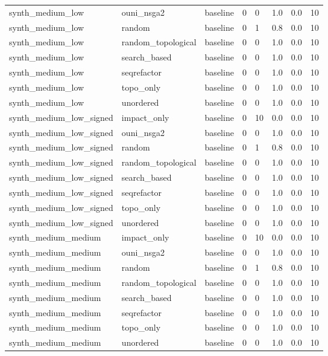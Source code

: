 \begin{table}[t]
\begin{tabular}{llllllll}
synth\_medium\_low & ouni\_nsga2 & baseline & 0 & 0 & 1.0 & 0.0 & 10 \\
synth\_medium\_low & random & baseline & 0 & 1 & 0.8 & 0.0 & 10 \\
synth\_medium\_low & random\_topological & baseline & 0 & 0 & 1.0 & 0.0 & 10 \\
synth\_medium\_low & search\_based & baseline & 0 & 0 & 1.0 & 0.0 & 10 \\
synth\_medium\_low & seqrefactor & baseline & 0 & 0 & 1.0 & 0.0 & 10 \\
synth\_medium\_low & topo\_only & baseline & 0 & 0 & 1.0 & 0.0 & 10 \\
synth\_medium\_low & unordered & baseline & 0 & 0 & 1.0 & 0.0 & 10 \\
synth\_medium\_low\_signed & impact\_only & baseline & 0 & 10 & 0.0 & 0.0 & 10 \\
synth\_medium\_low\_signed & ouni\_nsga2 & baseline & 0 & 0 & 1.0 & 0.0 & 10 \\
synth\_medium\_low\_signed & random & baseline & 0 & 1 & 0.8 & 0.0 & 10 \\
synth\_medium\_low\_signed & random\_topological & baseline & 0 & 0 & 1.0 & 0.0 & 10 \\
synth\_medium\_low\_signed & search\_based & baseline & 0 & 0 & 1.0 & 0.0 & 10 \\
synth\_medium\_low\_signed & seqrefactor & baseline & 0 & 0 & 1.0 & 0.0 & 10 \\
synth\_medium\_low\_signed & topo\_only & baseline & 0 & 0 & 1.0 & 0.0 & 10 \\
synth\_medium\_low\_signed & unordered & baseline & 0 & 0 & 1.0 & 0.0 & 10 \\
synth\_medium\_medium & impact\_only & baseline & 0 & 10 & 0.0 & 0.0 & 10 \\
synth\_medium\_medium & ouni\_nsga2 & baseline & 0 & 0 & 1.0 & 0.0 & 10 \\
synth\_medium\_medium & random & baseline & 0 & 1 & 0.8 & 0.0 & 10 \\
synth\_medium\_medium & random\_topological & baseline & 0 & 0 & 1.0 & 0.0 & 10 \\
synth\_medium\_medium & search\_based & baseline & 0 & 0 & 1.0 & 0.0 & 10 \\
synth\_medium\_medium & seqrefactor & baseline & 0 & 0 & 1.0 & 0.0 & 10 \\
synth\_medium\_medium & topo\_only & baseline & 0 & 0 & 1.0 & 0.0 & 10 \\
synth\_medium\_medium & unordered & baseline & 0 & 0 & 1.0 & 0.0 & 10 \\

\end{tabular}
\end{table}
